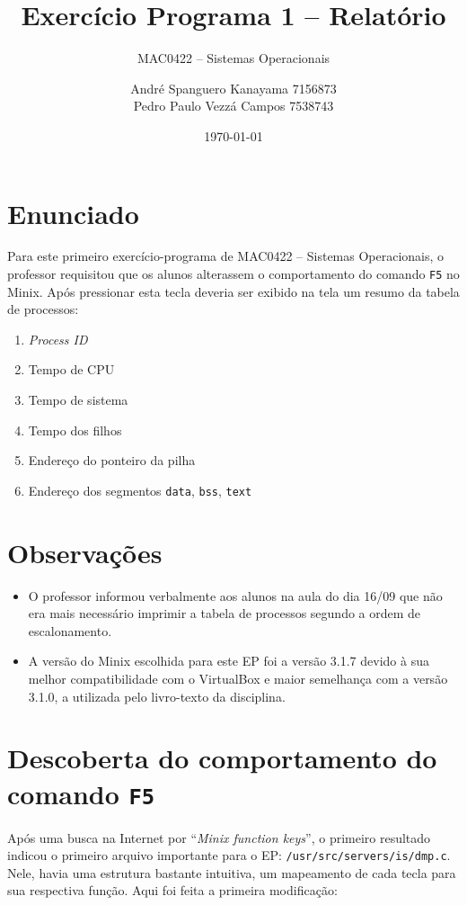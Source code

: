 \documentclass[brazil, a4paper]{scrartcl}
\begin{document}
\title{Exercício Programa 1 -- Relatório}
\subtitle{MAC0422 -- Sistemas Operacionais}
\author{André Spanguero Kanayama \hfill 7156873\\
		Pedro Paulo Vezzá Campos \hfill 7538743}
\date{\today}

\maketitle


\section{Enunciado}
Para este primeiro exercício-programa de MAC0422 -- Sistemas Operacionais, o 
professor requisitou que os alunos alterassem o comportamento do comando
\texttt{F5} no Minix. Após pressionar esta tecla deveria ser exibido
na tela um resumo da tabela de processos:

\begin{enumerate}
	\item \emph{Process ID}
	\item Tempo de CPU
	\item Tempo de sistema
	\item Tempo dos filhos
	\item Endereço do ponteiro da pilha
	\item Endereço dos segmentos \texttt{data}, \texttt{bss}, \texttt{text} 
\end{enumerate}

\section{Observações}
\begin{itemize}
	\item O professor informou verbalmente aos alunos na aula do dia 16/09 que
	não era mais necessário imprimir a tabela de processos segundo a ordem de
	escalonamento.
	\item A versão do Minix escolhida para este EP foi a versão 3.1.7 devido à
	sua melhor compatibilidade com o VirtualBox e maior semelhança com a versão 
	3.1.0, a utilizada pelo livro-texto da disciplina.
\end{itemize}

\section{Descoberta do comportamento do comando \texttt{F5}}
Após uma busca na Internet por ``\emph{Minix function keys}'', o primeiro
resultado indicou o primeiro arquivo importante para o EP: 
\texttt{/usr/src/servers/is/dmp.c}. Nele, havia uma estrutura bastante
intuitiva, um mapeamento de cada tecla para sua respectiva função. Aqui foi
feita a primeira modificação:
\end{document}
